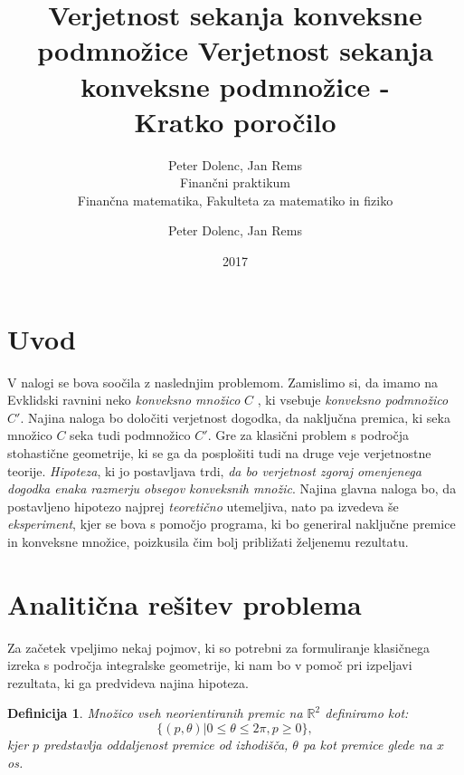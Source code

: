 \documentclass[a4paper]{article}
\title{Verjetnost sekanja konveksne podmnožice}
\author{Peter Dolenc, Jan Rems \\ Finančni praktikum \\ Finančna matematika, Fakulteta za matematiko in fiziko}
\date{2017}
\newtheorem{definicija}{Definicija}
\begin{document}
\title{%
  Verjetnost sekanja konveksne podmnožice -\\
   \large Kratko poročilo \\}

\author{Peter Dolenc, Jan Rems}

\maketitle

\pagebreak

\section{Uvod}


V nalogi se bova soočila z naslednjim problemom. Zamislimo si, da imamo na Evklidski ravnini neko \textit{konveksno množico} $C$ , ki vsebuje \textit{konveksno podmnožico } $C'$. Najina naloga bo določiti verjetnost dogodka, da naključna premica, ki seka množico $C$ seka tudi podmnožico $C'$. Gre za klasični problem s področja stohastične geometrije, ki se ga da posplošiti tudi na druge veje verjetnostne teorije. \textit{Hipoteza}, ki jo postavljava trdi, \textit{da bo verjetnost zgoraj omenjenega dogodka enaka razmerju obsegov konveksnih množic}. Najina glavna naloga bo, da postavljeno hipotezo najprej \textit{teoretično} utemeljiva, nato pa izvedeva še \textit{eksperiment}, kjer se bova s pomočjo programa, ki bo generiral naključne premice in konveksne množice, poizkusila čim bolj približati željenemu rezultatu. 


\vspace{4 mm}


\section{Analitična rešitev problema}

Za začetek vpeljimo nekaj pojmov, ki so potrebni za formuliranje klasičnega izreka s področja integralske geometrije, ki nam bo v pomoč pri izpeljavi rezultata, ki ga predvideva najina hipoteza.

\begin{definicija}
Množico vseh neorientiranih premic na $\mathbb{R}^2$ definiramo kot: $$ \{ (p,\theta)|0 \le \theta \le 2 \pi , p \ge 0\},$$ kjer $p$ predstavlja oddaljenost premice od izhodišča, $\theta$ pa kot premice glede na $x$ os.
\end{definicija}

\vspace{3 mm}
\end{document}
